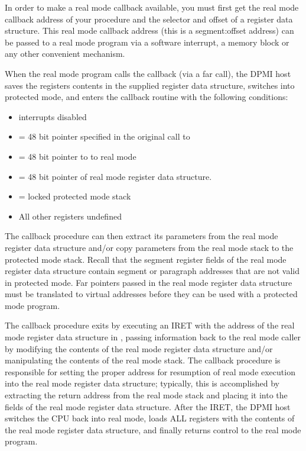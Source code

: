 In order to make a real mode callback available, you must first get the real
mode callback address of your procedure and the selector and offset of a
register data structure. This real mode callback address (this is a
segment:offset address) can be passed to a real mode program via a software
interrupt, a \dos memory block or any other convenient mechanism.

When the real mode program calls the callback (via a far call), the DPMI
host saves the registers contents in the supplied register data structure,
switches into protected mode, and enters the callback routine with the
following conditions:

\begin{itemize}
\item interrupts disabled
\item {} = 48 bit pointer specified in the original call to 
\item {} = 48 bit pointer to to real mode 
\item {} = 48 bit pointer of real mode register data
structure. 
\item {} = locked protected mode stack
\item  All other registers undefined
\end{itemize}

The callback procedure can then extract its parameters from the real mode
register data structure and/or copy parameters from the real mode stack to
the protected mode stack. Recall that the segment register fields of the
real mode register data structure contain segment or paragraph addresses
that are not valid in protected mode. Far pointers passed in the real mode
register data structure must be translated to virtual addresses before they
can be used with a protected mode program.

The callback procedure exits by executing an IRET with the address of the
real mode register data structure in , passing information back to
the real mode caller by modifying the contents of the real mode register
data structure and/or manipulating the contents of the real mode stack. The
callback procedure is responsible for setting the proper address for
resumption of real mode execution into the real mode register data
structure; typically, this is accomplished by extracting the return address
from the real mode stack and placing it into the  fields of the real
mode register data structure. After the IRET, the DPMI host switches the CPU
back into real mode, loads ALL registers with the contents of the real mode
register data structure, and finally returns control to the real mode
program.

